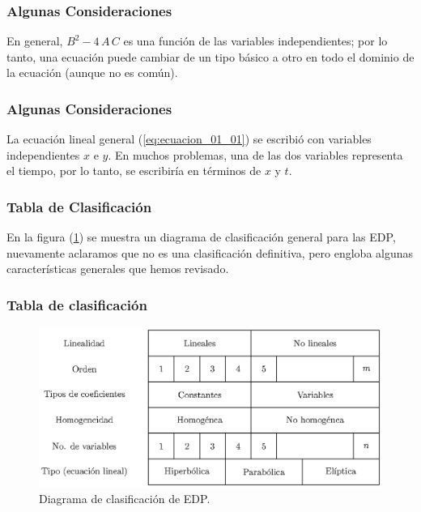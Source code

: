 \documentclass[12pt]{beamer}
\begin{document}
\begin{frame}
\frametitle{Algunas Consideraciones}
En general, $B^{2} - 4 \, A \, C$ es una función de las variables independientes; por lo tanto, una ecuación puede cambiar de un tipo básico a otro en todo el dominio de la ecuación (aunque no es común).
\end{frame}
\begin{frame}
\frametitle{Algunas Consideraciones}
La ecuación lineal general (\ref{eq:ecuacion_01_01}) se escribió con variables independientes $x$ e $y$. En muchos problemas, una de las dos variables representa el tiempo, por lo tanto, se escribiría en términos de $x$ y $t$.
\end{frame}
\begin{frame}
\frametitle{Tabla de Clasificación}
En la figura (\ref{fig:figura_clasificacion_EDP}) se muestra un diagrama de clasificación general para las EDP, nuevamente aclaramos que no es una clasificación definitiva, pero engloba algunas características generales que hemos revisado.
\end{frame}
\begin{frame}
\frametitle{Tabla de clasificación}
\begin{figure}[H]
    \centering
    \includegraphics[scale=0.87]{Imagenes/Cuadro_Clasificacion_EDP.eps}
    \caption{Diagrama de clasificación de EDP.}
    \label{fig:figura_clasificacion_EDP}
\end{figure}
\end{frame}
\end{document}
